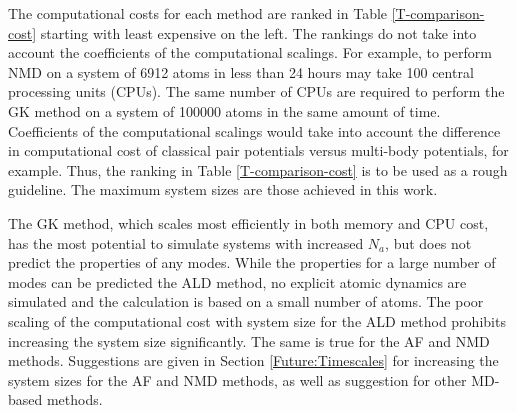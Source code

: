 The computational costs for each method are ranked in 
Table \ref{T-comparison-cost} starting with least 
expensive on the left. 
The rankings do not take into account the 
coefficients of the computational 
scalings. For example, to perform NMD on a system 
of 6912 atoms in less 
than 24 hours may take 100 central processing 
units (CPUs).
The same number of 
CPUs are required 
to perform the GK method on a system of 
100000 atoms in the same amount of 
time. Coefficients of the computational scalings would take into 
account the difference in computational cost of classical pair 
potentials versus multi-body potentials, for example. 
Thus, the ranking in Table \ref{T-comparison-cost} is to be used as a 
rough guideline. The maximum system 
sizes are those achieved in this work.  

The GK method, which scales most efficiently in both memory and CPU 
cost, has the most potential to simulate systems with increased 
$N_a$, but does not predict the properties of any modes. 
While the properties for a large number of modes 
can be predicted the ALD method, 
no explicit atomic dynamics are simulated and the calculation is based 
on a small number of atoms. The poor scaling of the 
computational cost with system size for the ALD method prohibits 
increasing the system size significantly. The same is true for the 
AF and NMD methods. Suggestions are given in 
Section \ref{Future:Timescales} for increasing the system sizes for the 
AF and NMD methods, as well as suggestion for other MD-based methods.

